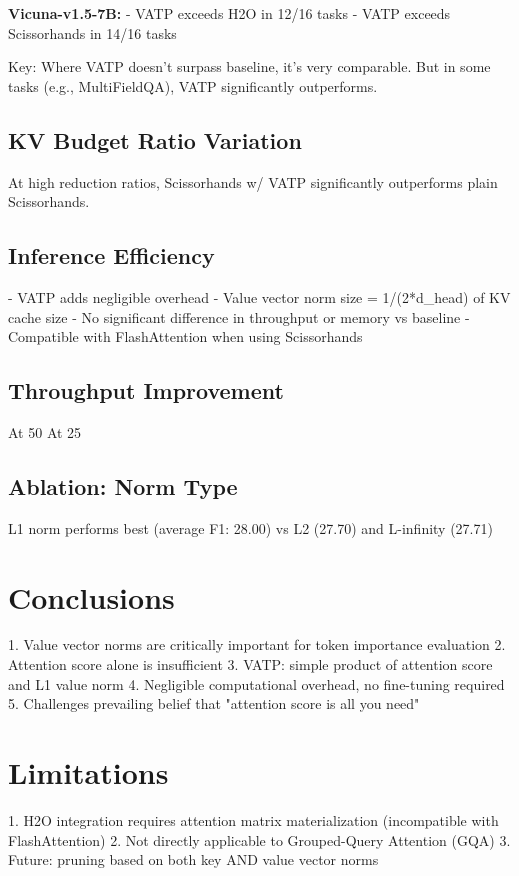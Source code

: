\textbf{Vicuna-v1.5-7B:}
- VATP exceeds H2O in 12/16 tasks
- VATP exceeds Scissorhands in 14/16 tasks

Key: Where VATP doesn't surpass baseline, it's very comparable. But in some tasks (e.g., MultiFieldQA), VATP significantly outperforms.

\subsection{KV Budget Ratio Variation}
At high reduction ratios, Scissorhands w/ VATP significantly outperforms plain Scissorhands.

\subsection{Inference Efficiency}
- VATP adds negligible overhead
- Value vector norm size = 1/(2*d_head) of KV cache size
- No significant difference in throughput or memory vs baseline
- Compatible with FlashAttention when using Scissorhands

\subsection{Throughput Improvement}
At 50%
At 25%

\subsection{Ablation: Norm Type}
L1 norm performs best (average F1: 28.00) vs L2 (27.70) and L-infinity (27.71)

\section{Conclusions}
1. Value vector norms are critically important for token importance evaluation
2. Attention score alone is insufficient
3. VATP: simple product of attention score and L1 value norm
4. Negligible computational overhead, no fine-tuning required
5. Challenges prevailing belief that "attention score is all you need"

\section{Limitations}
1. H2O integration requires attention matrix materialization (incompatible with FlashAttention)
2. Not directly applicable to Grouped-Query Attention (GQA)
3. Future: pruning based on both key AND value vector norms
